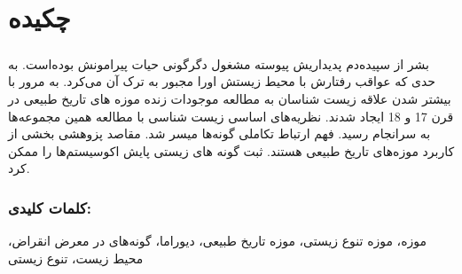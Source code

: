 
\chapter*{چکیده}

\paragraph*{}
بشر از سپیده‌دم پدیداریش پیوسته مشغول دگرگونی حیات پیرامونش بوده‌است. به حدی که عواقب رفتارش با محیط زیستش اورا مجبور به ترک آن می‌کرد. به مرور با بیشتر شدن علاقه زیست شناسان به مطالعه موجودات زنده موزه های تاریخ طبیعی در قرن 17 و 18 ایجاد شدند. 
نظریه‌های اساسی زیست شناسی با مطالعه همین مجموعه‌ها به سرانجام رسید. فهم ارتباط تکاملی گونه‌ها میسر شد. مقاصد پزوهشی بخشی از کاربرد موزه‌های تاریخ طبیعی هستند. ثبت گونه های زیستی پایش اکوسیستم‌ها را ممکن کرد.

\subsection*{کلمات کلیدی:}
موزه، موزه تنوع زیستی، موزه تاریخ طبیعی، دیوراما، گونه‌های در معرض انقراض، محیط زیست، تنوع زیستی
